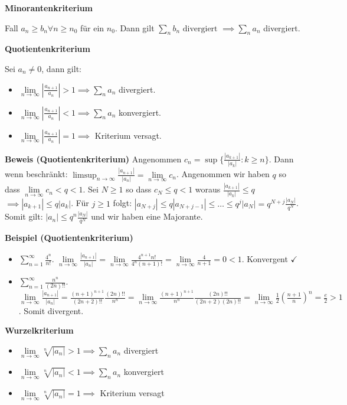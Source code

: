 \documentclass[25pt]{sciposter}
\newcommand{\limm}{\lim\limits_{n \to \infty}}
\newenvironment{method}[1]{\begin{mdframed}[backgroundcolor=blue!10,innertopmargin=15pt, innerbottommargin=15pt, nobreak=true]
		\textbf{#1 }
	}
	{ 
	\end{mdframed}
}
\begin{document}
\begin{multicols}{3}
\begin{method}{Minorantenkriterium}
	Fall $a_n \geq b_n \forall n \geq n_0$ für ein $n_0$. Dann gilt $\sum_n b_n \text{ divergiert } \implies \sum_{n} a_n$ divergiert.
\end{method}




\begin{method}{Quotientenkriterium}
	Sei $a_n \not = 0$, dann gilt:
	\begin{itemize}
		\item $\lim\limits_{n \to \infty} |\frac{a_{n+1}}{a_n}|> 1 \implies \sum_{n} a_n$ divergiert. 
		\item $\lim\limits_{n \to \infty} |\frac{a_{n+1}}{a_n}|< 1 \implies \sum_{n} a_n$ konvergiert. 
		\item $\lim\limits_{n \to \infty} |\frac{a_{n+1}}{a_n}|=  1 \implies $ Kriterium versagt.
	\end{itemize}
\end{method}

\textbf{Beweis (Quotientenkriterium)} Angenommen $c_n = \sup\{ \frac{|a_{k+1}|}{|a_{k}|} : k \geq n \}$. Dann wenn beschränkt: $\limsup_{n\to \infty} \frac{|a_{n+1}|}{|a_{n}|} = \limm c_n$. Angenommen wir haben $q$ so dass $\limm c_n < q < 1$. Sei $N \geq 1$ so dass $c_N \leq q < 1$ woraus $\frac{|a_{k+1}|}{|a_k|} \leq q$ $\implies |a_{k+1}| \leq q |a_k|$. Für $j\geq 1$ folgt: $|a_{N+j}|\leq q|a_{N+j-1}| \leq \ldots \leq q^j |a_N| = q^{N+j} \frac{|a_N|}{q^N}$. Somit gilt: $|a_n| \leq q^n \frac{|a_N|}{q^N}$ und wir haben eine Majorante.

\textbf{Beispiel (Quotientenkriterium)}

\begin{itemize}
	\item $\sum_{n = 1}^\infty \frac{4^n}{n!}$. $\limm \frac{|a_{n+1}|}{|a_n|} = \limm \frac{4^{n+1} n!}{4^n (n+1)!} = \limm \frac{4}{n+1} = 0 < 1$. Konvergent $\checkmark$
	
	\item $\sum_{n = 1}^\infty \frac{n^n}{(2n)!!}$.  $\limm \frac{|a_{n+1}|}{|a_n|}  = \frac{(n+1)^{n+1}}{(2n+2)!!} \frac{(2n)!!}{n^n} = \limm \frac{(n+1)^{n+1}}{n^n} \frac{(2n)!!}{(2n+2)(2n)!!} = \limm \frac{1}{2} \left( \frac{n+1}{n} \right)^n = \frac{e}{2}>1$. Somit divergent.
\end{itemize}





\begin{method}{Wurzelkriterium}
	\begin{itemize}
		\item $\lim\limits_{n \to \infty} \sqrt[n]{|a_n|}>1 \implies \sum_{n} a_n $ divergiert
		\item $\lim\limits_{n \to \infty} \sqrt[n]{|a_n|}<1 \implies \sum_{n} a_n $ konvergiert
		\item $\lim\limits_{n \to \infty} \sqrt[n]{|a_n|}=1 \implies $ Kriterium versagt
	\end{itemize}
\end{method}


\end{multicols}
\end{document}
